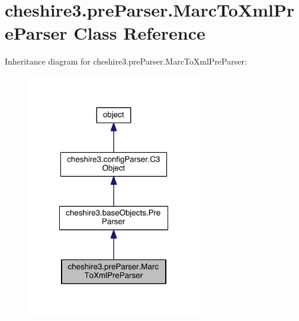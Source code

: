 \hypertarget{classcheshire3_1_1pre_parser_1_1_marc_to_xml_pre_parser}{\section{cheshire3.\-pre\-Parser.\-Marc\-To\-Xml\-Pre\-Parser Class Reference}
\label{classcheshire3_1_1pre_parser_1_1_marc_to_xml_pre_parser}
}


Inheritance diagram for cheshire3.\-pre\-Parser.\-Marc\-To\-Xml\-Pre\-Parser\-:
\nopagebreak
\begin{figure}[H]
\begin{center}
\leavevmode
\includegraphics[width=216pt]{classcheshire3_1_1pre_parser_1_1_marc_to_xml_pre_parser__inherit__graph}
\end{center}
\end{figure}


